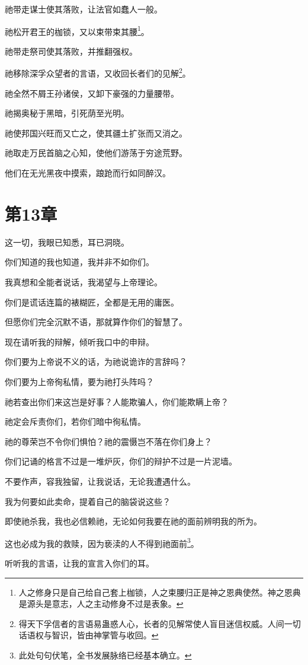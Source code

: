 \documentclass[12pt,oneside]{book}
\begin{document}
祂带走谋士使其落败，让法官如蠢人一般。

祂松开君王的枷锁，又以束带束其腰\footnote{人之修身只是自己给自己套上枷锁，人之束腰归正是神之恩典使然。神之恩典是源头是意志，人之主动修身不过是表象。}。

祂带走祭司使其落败，并推翻强权。

祂移除深孚众望者的言语，又收回长者们的见解\footnote{得天下孚信者的言语易蛊惑人心，长者的见解常使人盲目迷信权威。人间一切话语权与智识，皆由神掌管与收回。}。

祂全然不屑王孙诸侯，又卸下豪强的力量腰带。

祂揭奥秘于黑暗，引死荫至光明。

祂使邦国兴旺而又亡之，使其疆土扩张而又消之。

祂取走万民首脑之心知，使他们游荡于穷途荒野。

他们在无光黑夜中摸索，踉跄而行如同醉汉。



\chapter{第13章}
这一切，我眼已知悉，耳已洞晓。

你们知道的我也知道，我并非不如你们。

我真想和全能者说话，我渴望与上帝理论。

你们是谎话连篇的裱糊匠，全都是无用的庸医。

但愿你们完全沉默不语，那就算作你们的智慧了。

现在请听我的辩解，倾听我口中的申辩。

你们要为上帝说不义的话，为祂说诡诈的言辞吗？

你们要为上帝徇私情，要为祂打头阵吗？

祂若查出你们来这岂是好事？人能欺骗人，你们能欺瞒上帝？

祂定会斥责你们，若你们暗中徇私情。

祂的尊荣岂不令你们惧怕？祂的震慑岂不落在你们身上？

你们记诵的格言不过是一堆炉灰，你们的辩护不过是一片泥墙。

不要作声，容我独留，让我说话，无论我遭遇什么。

我为何要如此卖命，提着自己的脑袋说这些？

即使祂杀我，我也必信赖祂，无论如何我要在祂的面前辨明我的所为。

这也必成为我的救赎，因为亵渎的人不得到祂面前\footnote{此处句句伏笔，全书发展脉络已经基本确立。}。

听听我的言语，让我的宣言入你们的耳。
\end{document}
